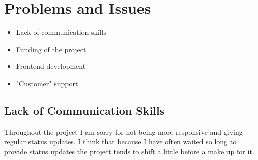 \section{Problems and Issues}


\begin{itemize}
	\item Lack of communication skills
	\item Funding of the project 
	\item Frontend development
	\item "Customer" support
\end{itemize}

\subsection{Lack of Communication Skills}
Throughout the project I am sorry for not being more responsive 
and giving regular status updates. I think that because I have 
often waited so long to provide status updates the project tends
to shift a little before a make up for it.


\subsection{}
